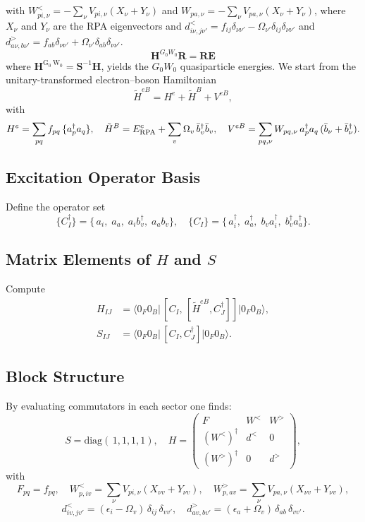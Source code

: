 with $W_{p i, \nu}^< = -\sum_\nu V_{p i, \nu} (X_{\nu} + Y_{\nu})$ and $W_{p a, \nu} = -\sum_\nu V_{p a, \nu} (X_{\nu} + Y_{\nu})$, where $X_{\nu}$ and $Y_{\nu}$ are the RPA eigenvectors and $d^<_{i \nu, j \nu'} = f_{i j} \delta_{\nu \nu'} - \Omega_{\nu'} \delta_{i j} \delta_{\nu \nu'}$ and $d^>_{a \nu, b \nu'} = f_{a b} \delta_{\nu \nu'} + \Omega_{\nu'} \delta_{a b} \delta_{\nu \nu'}$.
$$
\mathbf{H}^{G_0 W_0} \mathbf{R}=\mathbf{R} \mathbf{E}
$$
where $\mathbf{H}^{\mathrm{G}_0 \mathrm{~W}_0}=\mathbf{S}^{-1} \mathbf{H}$, yields the $G_0 W_0$ quasiparticle energies. 
We start from the unitary-transformed electron–boson Hamiltonian
\[
\tilde H^{eB}=H^e+\tilde H^B+V^{eB},
\]
with
\[
H^e=\sum_{pq}f_{pq}\,\{a_p^\dagger a_q\},
\quad
\tilde H^B=E^c_{\rm RPA}+\sum_v\Omega_v\,\bar b_v^\dagger\bar b_v,
\quad
V^{eB}=\sum_{pq,\nu}W_{pq,\nu}\,a_p^\dagger a_q\,(\bar b_\nu+\bar b_\nu^\dagger).
\]

\subsection*{Excitation Operator Basis}
Define the operator set
\[
\{C_I^\dagger\}=
\{\,a_i,\;a_a,\;a_i b_v^\dagger,\;a_a b_v\},
\quad
\{C_I\}=
\{\,a_i^\dagger,\;a_a^\dagger,\;b_v a_i^\dagger,\;b_v^\dagger a_a^\dagger\}.
\]

\subsection*{Matrix Elements of $H$ and $S$}
Compute
\begin{align*}
H_{IJ}&=\bigl\langle0_F0_B\bigl|\,[C_I,\,[\tilde H^{eB},C_J^\dagger]]\bigr|0_F0_B\bigr\rangle,\\
S_{IJ}&=\bigl\langle0_F0_B\bigl|\,[C_I,C_J^\dagger]\bigr|0_F0_B\bigr\rangle.
\end{align*}

\subsection*{Block Structure}
By evaluating commutators in each sector one finds:
\[
S=\mathrm{diag}(\,1,1,1,1),
\quad
H=\begin{pmatrix}
F & W^< & W^>\\
(W^<)^\dagger & d^< & 0\\
(W^>)^\dagger & 0 & d^>
\end{pmatrix},
\]
with
\[
F_{pq}=f_{pq},
\quad
W^<_{p,i v} = \sum_\nu V_{pi,\nu}(X_{\nu v}+Y_{\nu v}),
\quad
W^>_{p,a v}=\sum_\nu V_{pa,\nu}(X_{\nu v}+Y_{\nu v}),
\]
\[
d^<_{i v,j v'}=(\epsilon_i-\Omega_v)\,\delta_{ij}\,\delta_{vv'},
\quad
d^>_{a v,b v'}=(\epsilon_a+\Omega_v)\,\delta_{ab}\,\delta_{vv'}.
\]

